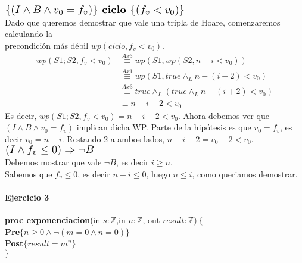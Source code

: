 \documentclass{article}
\begin{document}
	$\scalebox{1.3}{$\{(I\wedge B\wedge v_0=f_v)\}\textbf{ ciclo }\{(f_v<v_0)\}$}$\medskip \\
	Dado que queremos demostrar que vale una tripla de Hoare, comenzaremos calculando la\\ precondición más débil $wp(ciclo,f_v<v_0)$.
	\begin{align*}
		wp(S1;S2,f_v<v_0)&\stackrel{Ax3}{\equiv}wp(S1,wp(S2,n-i<v_0))\\
			&\stackrel{Ax1}{\equiv}wp(S1,true\wedge_L n-(i+2)<v_0)\\
			&\stackrel{Ax3}{\equiv}true\wedge_L(true\wedge_L  n-(i+2)<v_0)\\
			&\equiv n-i-2<v_0
	\end{align*}
	Es decir, $wp(S1;S2,f_v<v_0)=n-i-2<v_0$. Ahora debemos ver que $(I\wedge B\wedge v_0=f_v)$ implican dicha WP. Parte de la 
	hipótesis es que $v_0=f_v$, es decir $v_0=n-i$. Restando 2 a ambos lados, $n-i-2=v_0-2<v_0$.\medskip \\
	$\scalebox{1.3}{$(I\wedge f_v\leq 0)\Rightarrow \neg B$}$\medskip\\
	Debemos mostrar que vale $\neg B$, es decir $i\geq n$.\\
	Sabemos que $f_v\leq 0$, es decir $n-i\leq 0$, luego $n\leq i$, como queriamos demostrar.
	
	
	
	
	
\paragraph{Ejercicio 3\\}
\noindent
\textbf{proc exponenciacion}(in $s: \mathbb{Z}$,in $n:\mathbb{Z}$, out $result: \mathbb{Z})\ \{$\smallskip \\
\hspace*{6mm}\textbf{Pre}$\{ n\geq 0 \wedge \neg(m=0\wedge n=0)\}$\\
\hspace*{6mm}\textbf{Post}$\{ result=m^n\}$\\
$\}$\medskip\\
\end{document}
